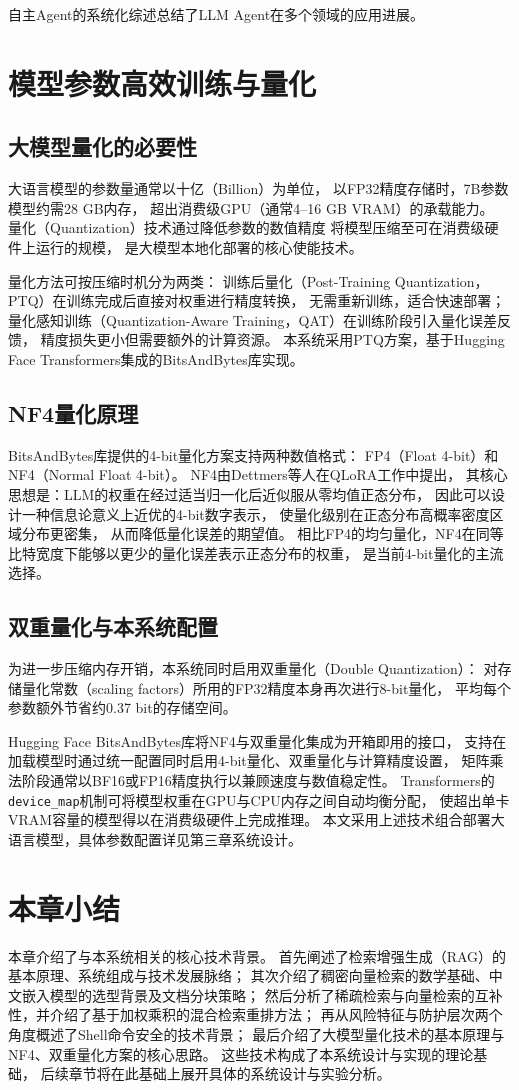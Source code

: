 自主Agent的系统化综述总结了LLM Agent在多个领域的应用进展。

\section{模型参数高效训练与量化}

\subsection{大模型量化的必要性}

大语言模型的参数量通常以十亿（Billion）为单位，
以FP32精度存储时，7B参数模型约需28 GB内存，
超出消费级GPU（通常4--16 GB VRAM）的承载能力。
量化（Quantization）技术通过降低参数的数值精度
将模型压缩至可在消费级硬件上运行的规模，
是大模型本地化部署的核心使能技术。

量化方法可按压缩时机分为两类：
训练后量化（Post-Training Quantization，PTQ）在训练完成后直接对权重进行精度转换，
无需重新训练，适合快速部署；
量化感知训练（Quantization-Aware Training，QAT）在训练阶段引入量化误差反馈，
精度损失更小但需要额外的计算资源。
本系统采用PTQ方案，基于Hugging Face Transformers集成的BitsAndBytes库实现。

\subsection{NF4量化原理}

BitsAndBytes库提供的4-bit量化方案支持两种数值格式：
FP4（Float 4-bit）和 NF4（Normal Float 4-bit）。
NF4由Dettmers等人在QLoRA工作中提出，
其核心思想是：LLM的权重在经过适当归一化后近似服从零均值正态分布，
因此可以设计一种信息论意义上近优的4-bit数字表示，
使量化级别在正态分布高概率密度区域分布更密集，
从而降低量化误差的期望值。
相比FP4的均匀量化，NF4在同等比特宽度下能够以更少的量化误差表示正态分布的权重，
是当前4-bit量化的主流选择。

\subsection{双重量化与本系统配置}

为进一步压缩内存开销，本系统同时启用双重量化（Double Quantization）：
对存储量化常数（scaling factors）所用的FP32精度本身再次进行8-bit量化，
平均每个参数额外节省约0.37 bit的存储空间。

Hugging Face BitsAndBytes库将NF4与双重量化集成为开箱即用的接口，
支持在加载模型时通过统一配置同时启用4-bit量化、双重量化与计算精度设置，
矩阵乘法阶段通常以BF16或FP16精度执行以兼顾速度与数值稳定性。
Transformers的\texttt{device\_map}机制可将模型权重在GPU与CPU内存之间自动均衡分配，
使超出单卡VRAM容量的模型得以在消费级硬件上完成推理。
本文采用上述技术组合部署大语言模型，具体参数配置详见第三章系统设计。

\section{本章小结}

本章介绍了与本系统相关的核心技术背景。
首先阐述了检索增强生成（RAG）的基本原理、系统组成与技术发展脉络；
其次介绍了稠密向量检索的数学基础、中文嵌入模型的选型背景及文档分块策略；
然后分析了稀疏检索与向量检索的互补性，并介绍了基于加权乘积的混合检索重排方法；
再从风险特征与防护层次两个角度概述了Shell命令安全的技术背景；
最后介绍了大模型量化技术的基本原理与NF4、双重量化方案的核心思路。
这些技术构成了本系统设计与实现的理论基础，
后续章节将在此基础上展开具体的系统设计与实验分析。


